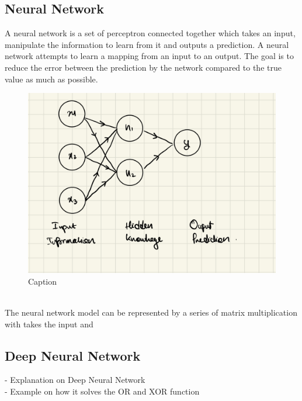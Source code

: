 \subsection{Neural Network}
A neural network is a set of perceptron connected together which takes an input, manipulate the information to learn from it and outputs a prediction. A neural network attempts to learn a mapping from an input to an output. The goal is to reduce the error between the prediction by the network compared to the true value as much as possible.
\begin{figure}
  \centering
  \includegraphics[scale=0.15]{CHAPTER_2/c2_fig_neural_network_1.jpeg}
  \caption{Caption}
  \label{neural_network}
\end{figure}
\vspace{50mm} \\
The neural network model can be represented by a series of matrix multiplication with takes the input and 
\subsection{Deep Neural Network}
- Explanation on Deep Neural Network \\
- Example on how it solves the OR and XOR function
